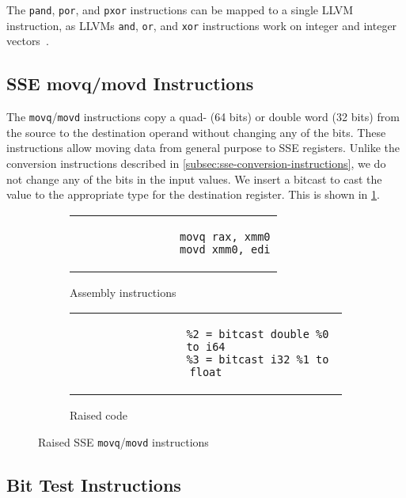 The \texttt{pand}, \texttt{por}, and \texttt{pxor} instructions can be mapped to a single LLVM instruction, as LLVMs \texttt{and}, \texttt{or}, and \texttt{xor} instructions work on integer and integer vectors~\parencite{llvm}.

\subsection{SSE movq/movd Instructions}\label{subsec:sse-movq-instructions}

The \texttt{movq}/\texttt{movd} instructions copy a quad- (64 bits) or double word (32 bits) from the source to the destination operand without changing any of the bits.
These instructions allow moving data from general purpose to SSE registers.
Unlike the conversion instructions described in \cref{subsec:sse-conversion-instructions}, we do not change any of the bits in the input values.
We insert a bitcast to cast the value to the appropriate type for the destination register.
This is shown in \cref{fig:raised-movq}.

\begin{figure}[htpb]
    \centering
    \begin{subfigure}{.45\textwidth}
        \begin{tabular}{c}
            \begin{lstlisting}
                movq rax, xmm0
                movd xmm0, edi
            \end{lstlisting}
        \end{tabular}
        \caption{Assembly instructions}
    \end{subfigure}
    \hfill%
    \begin{subfigure}{.45\textwidth}
        \begin{tabular}{c}
            \begin{lstlisting}
                %2 = bitcast double %0 to i64
                %3 = bitcast i32 %1 to float
            \end{lstlisting}
        \end{tabular}
        \caption{Raised code}
    \end{subfigure}
    \caption[Raised SSE movq/movd instructions]{Raised SSE \texttt{movq}/\texttt{movd} instructions}
    \label{fig:raised-movq}
\end{figure}

\subsection{Bit Test Instructions}\label{subsec:bit-test-instructions}

